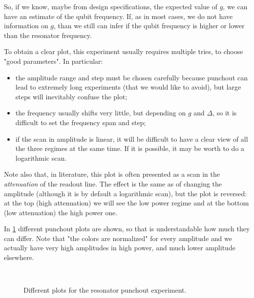 So, if we know, maybe from design specifications, the expected value of $g$, we can have an estimate of the qubit frequency.
If, as in most cases, we do not have information on $g$, than we still can infer if the qubit frequency is higher or lower than the resonator frequency.

To obtain a clear plot, this experiment usually requires multiple tries, to choose "good parameters".
In particular:
\begin{itemize}
    \item the amplitude range and step must be chosen carefully because punchout can lead to extremely long experiments (that we would like to avoid), but large steps will inevitably confuse the plot;
    \item the frequency usually shifts very little, but depending on $g$ and $\Delta$, so it is difficult to set the frequency span and step;
    \item if the scan in amplitude is linear, it will be difficult to have a clear view of all the three regimes at the same time. If it is possible, it may be worth to do a logarithmic scan.
\end{itemize}

Note also that, in literature, this plot is often presented as a scan in the \textit{attenuation} of the readout line.
The effect is the same as of changing the amplitude (although it is by default a logarithmic scan), but the plot is reversed: at the top (high attenuation) we will see the low power regime and at the bottom (low attenuation) the high power one.

In \cref{fig:punchouts} different punchout plots are shown, so that is understandable how much they can differ.
Note that "the colors are normalized" for every amplitude and we actually have very high amplitudes in high power, and much lower amplitude elsewhere.
\begin{figure}[ht]
    \centering
    \\
    \caption{Different plots for the resonator punchout experiment.}
    \label{fig:punchouts}
\end{figure}

